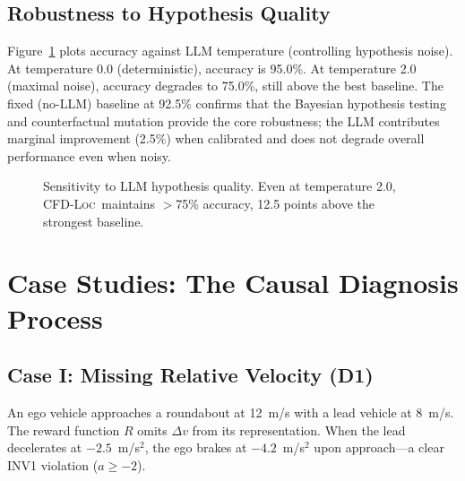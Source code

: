 \documentclass[journal]{IEEEtran}
\theoremstyle{plain}
\newcommand{\methodname}{\textsc{CFD-Loc}}
\begin{document}
\subsection{Robustness to Hypothesis Quality}

Figure~\ref{fig:sensitivity} plots accuracy against LLM temperature (controlling hypothesis noise). At temperature 0.0 (deterministic), accuracy is 95.0\%. At temperature 2.0 (maximal noise), accuracy degrades to 75.0\%, still above the best baseline. The fixed (no-LLM) baseline at 92.5\% confirms that the Bayesian hypothesis testing and counterfactual mutation provide the core robustness; the LLM contributes marginal improvement (2.5\%) when calibrated and does not degrade overall performance even when noisy.

\begin{figure}[t]
\centering
{}
\caption{Sensitivity to LLM hypothesis quality. Even at temperature 2.0, \methodname\ maintains $>$75\% accuracy, 12.5 points above the strongest baseline.}
\label{fig:sensitivity}
\end{figure}

\section{Case Studies: The Causal Diagnosis Process}

\subsection{Case I: Missing Relative Velocity (D1)}

An ego vehicle approaches a roundabout at 12~m/s with a lead vehicle at 8~m/s. The reward function $R$ omits $\Delta v$ from its representation. When the lead decelerates at $-2.5$~m/s$^2$, the ego brakes at $-4.2$~m/s$^2$ upon approach---a clear INV1 violation ($a \geq -2$).
\end{document}
